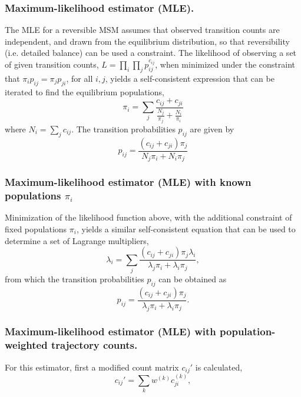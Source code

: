 \documentclass[%
 aip,
rsi,%
 amsmath,amssymb,
 reprint,%
]{revtex4-1}
\begin{document}
\subsubsection{Maximum-likelihood estimator (MLE).} 
The MLE for a reversible MSM assumes that observed transition counts are independent, and drawn from the equilibrium distribution, so that reversibility (i.e. detailed balance) can be used a constraint.  The likelihood of observing a set of given transition counts, $L = \prod_i \prod_j p_{ij}^{c_{ij}}$, when minimized under the constraint that $\pi_i p_{ij} = \pi_j p_{ji}$, for all $i, j$, yields a self-consistent expression that can be iterated to find the equilibrium populations,\cite{Wu:2014jya, Prinz:2011id, Bowman:2009jw}
\begin{equation}
\pi_i  = \sum_j \frac{c_{ij} + c_{ji}}{\frac{N_j}{\pi_j} + \frac{N_i}{\pi_i}}
\end{equation}
where $N_i = \sum_j c_{ij}$.  The transition probabilities $p_{ij}$ are  given by 
\begin{equation}
p_{ij} = \frac{(c_{ij} + c_{ji})\pi_j }{N_j\pi_i + N_i\pi_j } 
\end{equation}

\subsubsection{Maximum-likelihood estimator (MLE) with known populations $\pi_i$}
Minimization of the likelihood function above, with the additional constraint of fixed populations $\pi_i$, yields a similar self-consistent equation that can be used to determine a set of Lagrange multipliers,\cite{TrendelkampSchroer:2016bz}
\begin{equation}
\lambda_i  = \sum_j \frac{(c_{ij} + c_{ji})\pi_j \lambda_i}{\lambda_j\pi_i + \lambda_i\pi_j },
\end{equation}
from which the transition probabilities $p_{ij}$ can be obtained as
\begin{equation}
p_{ij} = \frac{(c_{ij} + c_{ji})\pi_j }{\lambda_j\pi_i + \lambda_i\pi_j }.
\end{equation}

\subsubsection{Maximum-likelihood estimator (MLE) with population-weighted trajectory counts.}
For this estimator, first a modified count matrix $c_{ij}'$ is calculated, 
\begin{equation}
c_{ij}' = \sum_k w^{(k)}c_{ji}^{(k)},
\end{equation}
\end{document}
